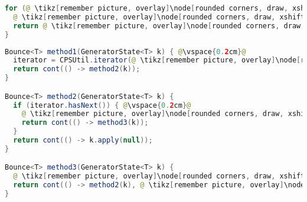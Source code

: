 \begin{center}
\begin{mdframed}[topline=true]
\begin{minipage}[t]{0.4\textwidth}
\begin{lstlisting}[language=Java, numbers=none, breaklines=true]
for (@ \tikz[remember picture, overlay]\node[rounded corners, draw, xshift=-0.1cm, inner sep=5pt, anchor=west, yshift=0.1cm] {Változó}; \hspace*{1.05cm}@ : @ \tikz[remember picture, overlay]\node[rounded corners, draw, xshift=-0.2cm, inner sep=5pt, anchor=west, yshift=0.1cm] {Forrás}; \vspace*{0.3cm} \hspace*{0.9cm}@) {
  @ \tikz[remember picture, overlay]\node[rounded corners, draw, xshift=-0.1cm, inner sep=5pt, anchor=west] {Kódrészlet}; \vspace*{0.5cm} @ 
  return @ \tikz[remember picture, overlay]\node[rounded corners, draw, xshift=-0.1cm, inner sep=5pt, anchor=west, yshift=0.1cm] {Kifejezés}; \vspace*{0.3cm} @
}
\end{lstlisting}
\end{minipage} 
\begin{minipage}[t]{0.6\textwidth}
\begin{lstlisting}[language=Java, numbers=none, breaklines=true]
Bounce<T> method1(GeneratorState<T> k) { @\vspace{0.2cm}@
  iterator = CPSUtil.iterator(@ \tikz[remember picture, overlay]\node[rounded corners, draw, xshift=-0.1cm, yshift=0.1cm, inner sep=5pt, anchor=west] {Forrás}; \vspace{0.3cm} \hspace*{1.0cm}@);
  return cont(() -> method2(k));
}

Bounce<T> method2(GeneratorState<T> k) {
  if (iterator.hasNext()) { @\vspace{0.2cm}@
    @ \tikz[remember picture, overlay]\node[rounded corners, draw, xshift=-0.1cm, inner sep=5pt, anchor=west, yshift=0.1cm] {Változó}; \vspace*{0.2cm} \hspace*{1.1cm}@ = iterator.next();
    return cont(() -> method3(k));
  }
  return cont(() -> k.apply(null));
}

Bounce<T> method3(GeneratorState<T> k) {
  @ \tikz[remember picture, overlay]\node[rounded corners, draw, xshift=-0.1cm, inner sep=5pt, anchor=west] {Kódrészlet}; \vspace*{0.3cm} @
  return cont(() -> method2(k), @ \tikz[remember picture, overlay]\node[rounded corners, draw, xshift=-0.1cm, inner sep=5pt, anchor=west, yshift=0.1cm] {Kifejezés}; \vspace*{0.2cm} \hspace*{1.2cm} @);
}
\end{lstlisting} 
\end{minipage}
\end{mdframed}
\end{center}

